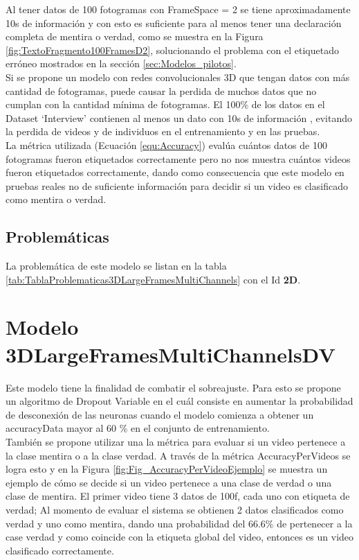 \begin{onehalfspacing}
Al tener datos de 100 fotogramas con FrameSpace = 2 se tiene aproximadamente 10s de información y con esto es suficiente para al menos tener una declaración completa de mentira o verdad, como se muestra en la Figura \ref{fig:TextoFragmento100FramesD2}, solucionando el problema con el etiquetado erróneo mostrados en la sección \ref{sec:Modelos_pilotos}.\\

Si se propone un modelo con redes convolucionales 3D que tengan datos con más cantidad de fotogramas, puede causar la perdida de muchos datos que no cumplan con la cantidad mínima de fotogramas. El 100\% de los datos en el Dataset `Interview' contienen al menos un dato con 10s de información , evitando la perdida de videos y de individuos en el entrenamiento y en las pruebas.\\

La métrica utilizada (Ecuación \ref{equ:Accuracy}) evalúa cuántos datos de 100 fotogramas fueron etiquetados correctamente pero no nos muestra cuántos videos fueron etiquetados correctamente, dando como consecuencia que este modelo en pruebas reales no de suficiente información para decidir si un video es clasificado como mentira o verdad.



\subsection{Problemáticas}
\label{sec:Problematicas3DLargeFramesMultiChannels}

La problemática de este modelo se listan en la tabla \ref{tab:TablaProblematicas3DLargeFramesMultiChannels} con el Id \textbf{2D}.



\section{ Modelo 3DLargeFramesMultiChannelsDV}
\label{sec:3DLargeFramesMultiChannelsDV}

Este modelo tiene la finalidad de combatir el sobreajuste. Para esto se propone un algoritmo de Dropout Variable en el cuál consiste en aumentar la probabilidad de desconexión de las neuronas cuando el modelo comienza a obtener un accuracyData mayor al 60 \% en el conjunto de entrenamiento.\\

También se propone utilizar una la métrica para evaluar si un video pertenece a la clase mentira o a la clase verdad. A través de la métrica AccuracyPerVideos se logra esto y en la Figura \ref{fig:Fig_AccuracyPerVideoEjemplo} se muestra un ejemplo de cómo se decide si un video pertenece a una clase de verdad o una clase de mentira. El primer video tiene 3 datos de 100f, cada uno con etiqueta de verdad; Al momento de evaluar el sistema se obtienen 2 datos clasificados como verdad y uno como mentira, dando una probabilidad del 66.6\%  de pertenecer a la case verdad y como coincide con la etiqueta global del video, entonces es un video clasificado correctamente.\\


\end{onehalfspacing}
